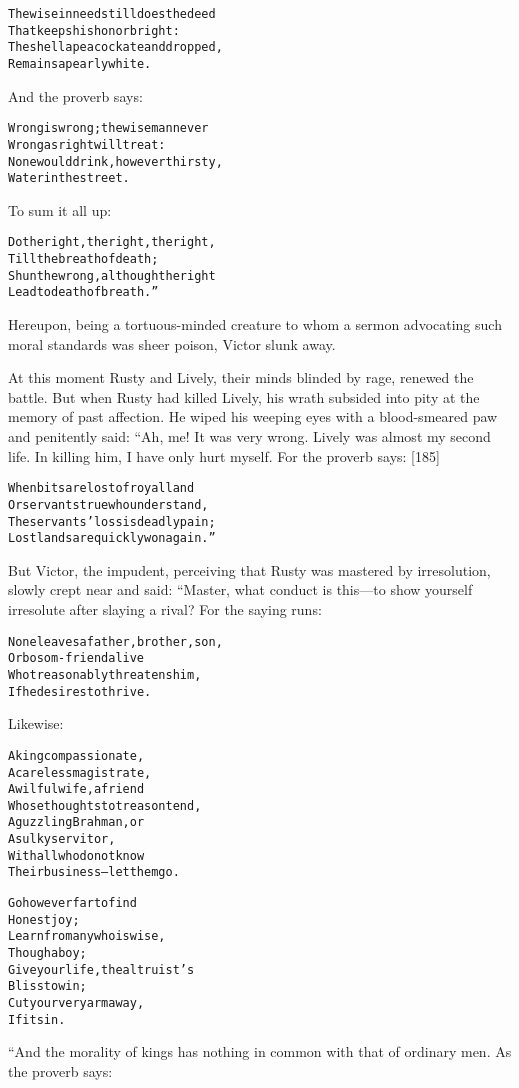 \documentclass{article}
\renewenvironment{verbatim}{\begin{alltt}\normalfont\begin{centering}}{\end{centering}\end{alltt}}
\begin{document}
\begin{verbatim}
The wise in need still does the deed
    That keeps his honor bright:
The shell a peacock ate and dropped,
    Remains a pearly white.
\end{verbatim}
And the proverb says:

\begin{verbatim}
Wrong is wrong; the wise man never
    Wrong as right will treat:
None would drink, however thirsty,
    Water in the street.
\end{verbatim}
To sum it all up:

\begin{verbatim}
Do the right, the right, the right,
    Till the breath of death;
Shun the wrong, although the right
    Lead to death of breath.”
\end{verbatim}
Hereupon, being a tortuous-minded creature to whom a sermon
advocating such moral standards was sheer poison, Victor slunk
away.

At this moment Rusty and Lively, their minds blinded by rage,
renewed the battle. But when Rusty had killed Lively, his wrath
subsided into pity at the memory of past affection. He wiped his
weeping eyes with a blood-smeared paw and penitently said: “Ah, me!
It was very wrong. Lively was almost my second life. In killing
him, I have only hurt myself. For the proverb says: [185]

\begin{verbatim}
When bits are lost of royal land
Or servants true who understand,
The servants' loss is deadly pain;
Lost lands are quickly won again.”
\end{verbatim}
But Victor, the impudent, perceiving that Rusty was mastered by
irresolution, slowly crept near and said: “Master, what conduct is
this---to show yourself irresolute after slaying a rival? For the
saying runs:

\begin{verbatim}
None leaves a father, brother, son,
    Or bosom-friend alive
Who treasonably threatens him,
    If he desires to thrive.
\end{verbatim}
Likewise:

\begin{verbatim}
A king compassionate,
A careless magistrate,
A wilful wife, a friend
Whose thoughts to treason tend,
A guzzling Brahman, or
A sulky servitor,
With all who do not know
Their business--let them go.

Go however far to find
    Honest joy;
Learn from any who is wise,
    Though a boy;
Give your life, the altruist's
    Bliss to win;
Cut your very arm away,
    If it sin.
\end{verbatim}
“And the morality of kings has nothing in common with that of
ordinary men. As the proverb says:
\end{document}
